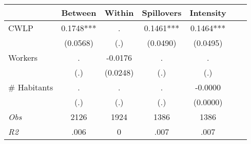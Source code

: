 \begin{tabular}{l*{6}{c}}\hline&\multicolumn{1}{c}{Between}&\multicolumn{1}{c}{Within}&\multicolumn{1}{c}{Spillovers}&\multicolumn{1}{c}{Intensity}\\ \hline 
CWLP & 0.1748*** & . & 0.1461*** & 0.1464*** \\
 & (0.0568) & (.) & (0.0490) & (0.0495) \\
Workers & . & -0.0176 & . & . \\
 & (.) & (0.0248) & (.) & (.) \\
\# Habitants & . & . & . & -0.0000 \\
  & (.) & (.) & (.) & (0.0000) \\
\hline \textit{Obs} & 2126 & 1924 & 1386 & 1386  \\ \textit{R2} & .006 & 0 & .007 & .007 \\ \hline \end{tabular}
